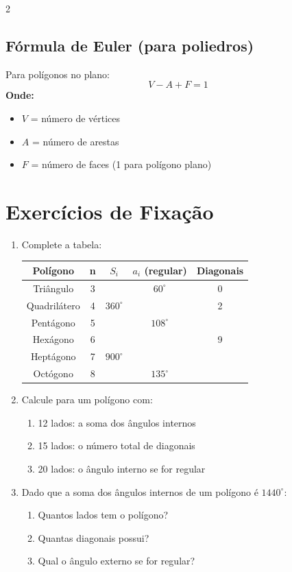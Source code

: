 \documentclass[11pt]{article}
\begin{document}
\begin{multicols}{2}
\subsection*{Fórmula de Euler (para poliedros)}
Para polígonos no plano:
\[
V - A + F = 1
\]
\textbf{Onde:}
\begin{itemize}
\item $V$ = número de vértices
\item $A$ = número de arestas
\item $F$ = número de faces (1 para polígono plano)
\end{itemize}

\section*{Exercícios de Fixação}

\begin{enumerate}[leftmargin=*]

\item Complete a tabela:

\begin{center}
\begin{tabular}{|c|c|c|c|c|}
\hline
\textbf{Polígono} & \textbf{n} & \textbf{$S_i$} & \textbf{$a_i$ (regular)} & \textbf{Diagonais} \\
\hline
Triângulo & 3 & & $60^\circ$ & 0 \\
\hline
Quadrilátero & 4 & $360^\circ$ & & 2 \\
\hline
Pentágono & 5 & & $108^\circ$ & \\
\hline
Hexágono & 6 & & & 9 \\
\hline
Heptágono & 7 & $900^\circ$ & & \\
\hline
Octógono & 8 & & $135^\circ$ & \\
\hline
\end{tabular}
\end{center}

\item Calcule para um polígono com:
\begin{enumerate}[label=\alph*)]
\item 12 lados: a soma dos ângulos internos
\item 15 lados: o número total de diagonais
\item 20 lados: o ângulo interno se for regular
\end{enumerate}

\item Dado que a soma dos ângulos internos de um polígono é $1440^\circ$:
\begin{enumerate}[label=\alph*)]
\item Quantos lados tem o polígono?
\item Quantas diagonais possui?
\item Qual o ângulo externo se for regular?
\end{enumerate}


\end{enumerate}
\end{multicols}
\end{document}

